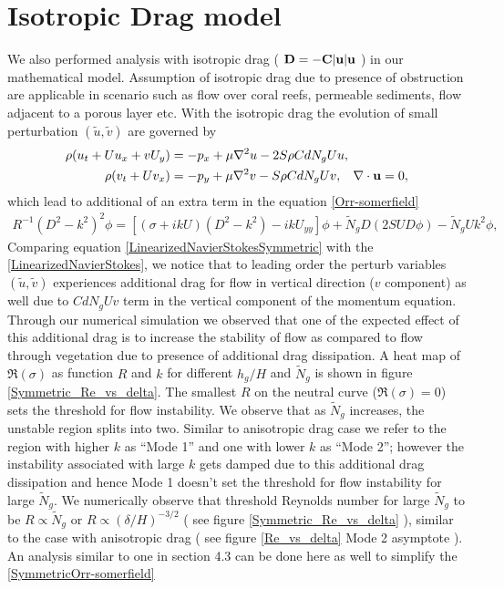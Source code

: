 \documentclass[12pt]{report}   %
\newcommand{\bu}{\mathbf{u}}
\newcommand{\Rey}{{R}}
\newcommand{\Ndg}{\tilde{N}_g}
\begin{document}
\chapter{Isotropic Drag model}
We also performed analysis with isotropic drag ( $\bf{D} = -C|\bu|\bu$ ) in our mathematical model. Assumption of isotropic drag due to presence of obstruction are applicable in scenario such as flow over coral reefs, permeable sediments, flow adjacent to a porous layer etc. With the isotropic drag the evolution of small perturbation $(\tilde{u}, \tilde{v})$ are governed by 
\begin{equation}
\begin{split}
\rho(u_t+U u_x+vU_y) &= -p_x+ {\mu}\nabla^2u-2S\rho C dN_{g}Uu, \\
\rho(v_t+ Uv_x) &= -p_y+ {\mu}\nabla^2v - S\rho C d N_g Uv, \hspace{0.3cm} \nabla\cdot\bu=0,
\label{LinearizedNavierStokesSymmetric}
\end{split} 
\end{equation}
which lead to additional of an extra term in the equation  \ref{Orr-somerfield}
\begin{equation}
\begin{split}
\Rey^{-1}\left(D^2 -k^{2} \right)^2\phi = \left[ \left({\sigma}+ikU\right) \left(D^2-k^2\right) -ikU_{yy}\right]\phi + 
\Ndg D\left(2 S U D \phi\right) - \Ndg U k^2\phi,
\label{SymmetricOrr-somerfield}
\end{split}
\end{equation}
Comparing equation \eqref{LinearizedNavierStokesSymmetric} with the \eqref{LinearizedNavierStokes}, we notice that to leading order the perturb variables $(\tilde{u},\tilde{v})$ experiences additional drag for flow in vertical direction ($v$ component) as well due to $C d N_g Uv$ term in the vertical component of the momentum equation. Through our numerical simulation we observed that one of the expected effect of this additional drag is to increase the stability of flow as compared to flow through vegetation due to presence of additional drag dissipation. A heat map of $\Re (\sigma)$ as function $R$ and $k$ for different $h_g/H$ and $\Ndg$ is shown in figure \ref{Symmetric_Re_vs_delta}. The smallest $R$ on the neutral curve 
($\Re (\sigma)=0$) sets the threshold for flow instability. We observe that as $\Ndg$ increases, the unstable region splits into two. Similar to anisotropic drag case we refer to the region with higher $k$ as ``Mode 1'' and one with lower $k$ as ``Mode 2''; however the instability associated with large $k$ gets damped due to this additional drag dissipation and hence Mode 1 doesn't set the threshold for flow instability for large $\Ndg$. We numerically observe that threshold Reynolds number for large $\Ndg$ to be $ R \propto \Ndg$  or $R \propto (\delta/H)^{-3/2}$ ( see figure \ref{Symmetric_Re_vs_delta} ), similar to the case with anisotropic drag ( see figure \ref{Re_vs_delta} Mode 2 asymptote ). An analysis similar to one in section 4.3 can be done here as well to simplify the \ref{SymmetricOrr-somerfield}
\end{document}
